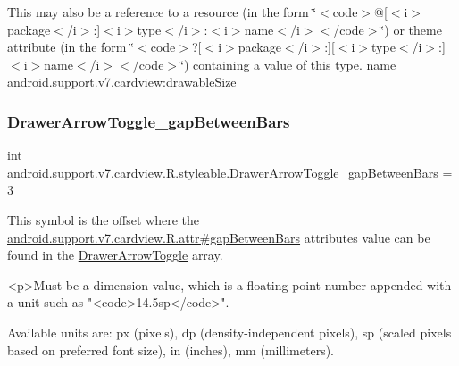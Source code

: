 This may also be a reference to a resource (in the form \char`\"{}$<$code$>$@\mbox{[}$<$i$>$package$<$/i$>$\+:\mbox{]}$<$i$>$type$<$/i$>$\+:$<$i$>$name$<$/i$>$$<$/code$>$\char`\"{}) or theme attribute (in the form \char`\"{}$<$code$>$?\mbox{[}$<$i$>$package$<$/i$>$\+:\mbox{]}\mbox{[}$<$i$>$type$<$/i$>$\+:\mbox{]}$<$i$>$name$<$/i$>$$<$/code$>$\char`\"{}) containing a value of this type.  name android.\+support.\+v7.\+cardview\+:drawable\+Size \mbox{\label{classandroid_1_1support_1_1v7_1_1cardview_1_1R_1_1styleable_afc4238a0fa5fbdfef7ef7f8e7e7a5fd7}} 
\subsubsection{\texorpdfstring{Drawer\+Arrow\+Toggle\+\_\+gap\+Between\+Bars}{DrawerArrowToggle\_gapBetweenBars}}
{\footnotesize\ttfamily int android.\+support.\+v7.\+cardview.\+R.\+styleable.\+Drawer\+Arrow\+Toggle\+\_\+gap\+Between\+Bars = 3\hspace{0.3cm}{\ttfamily [static]}}

This symbol is the offset where the \hyperlink{classandroid_1_1support_1_1v7_1_1cardview_1_1R_1_1attr_a80fbd1743023fac7c2382f1c969d7221}{android.\+support.\+v7.\+cardview.\+R.\+attr\#gap\+Between\+Bars} attribute\textquotesingle{}s value can be found in the \hyperlink{classandroid_1_1support_1_1v7_1_1cardview_1_1R_1_1styleable_a159ca17c520d2f2d93f6152d01b0b8df}{Drawer\+Arrow\+Toggle} array.

\begin{DoxyVerb}      <p>Must be a dimension value, which is a floating point number appended with a unit such as "<code>14.5sp</code>".
\end{DoxyVerb}
 Available units are\+: px (pixels), dp (density-\/independent pixels), sp (scaled pixels based on preferred font size), in (inches), mm (millimeters). 

